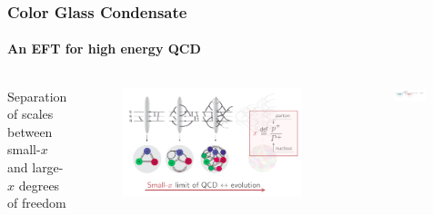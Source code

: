 \documentclass[aspectratio=169,11pt,usenames,dvipsnames]{beamer}
\begin{document}
\begin{frame}
    \frametitle{Color Glass Condensate}
    \framesubtitle{An EFT for high energy QCD}
    \vspace{-10pt}
    \begin{columns}[onlytextwidth,t]
            \begin{center}
                {\footnotesize Separation of scales between\\
                {\color{customgreen}small-{\tiny $x$}} and {\color{custompink}large-{\huge $x$}} degrees of freedom\footnotemark}
            \end{center}
            \vspace{-10pt}
            \begin{figure}[!hbt]
                \centering
                \includegraphics[width=\textwidth]{images/qcd_1.png}
                \captionsetup{justification=centering}
            \end{figure}
        \begin{center}
            {
            \begin{figure}[!hbt]
                \centering
                \includegraphics[width=0.9\textwidth]{images/small_large_x.png}

\end{figure}}
\end{center}
\end{columns}
\end{frame}
\end{document}
